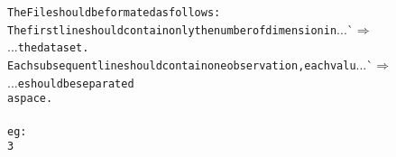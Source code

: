 {{\begin{tabbing}
{\texttt{\hspace{48pt}The\hspace{6pt}File\hspace{6pt}should\hspace{6pt}be\hspace{6pt}formated\hspace{6pt}as\hspace{6pt}follows:}}\\
{\texttt{\hspace{48pt}The\hspace{6pt}first\hspace{6pt}line\hspace{6pt}should\hspace{6pt}contain\hspace{6pt}only\hspace{6pt}the\hspace{6pt}number\hspace{6pt}of\hspace{6pt}dimension\hspace{6pt}in\hspace{6pt}}}{}...\`$\Rightarrow$\\
...{}{\texttt{the\hspace{6pt}data\hspace{6pt}set.}}\\
{\texttt{\hspace{48pt}Each\hspace{6pt}subsequent\hspace{6pt}line\hspace{6pt}should\hspace{6pt}contain\hspace{6pt}one\hspace{6pt}observation,\hspace{6pt}each\hspace{6pt}valu}}{}...\`$\Rightarrow$\\
...{}{\texttt{e\hspace{6pt}should\hspace{6pt}be\hspace{6pt}separated}}\\
{\texttt{\hspace{48pt}a\hspace{6pt}space.}}\\
\\
{\texttt{\hspace{48pt}eg:}}\\
{\texttt{\hspace{48pt}3}}\\

\end{tabbing}}}
